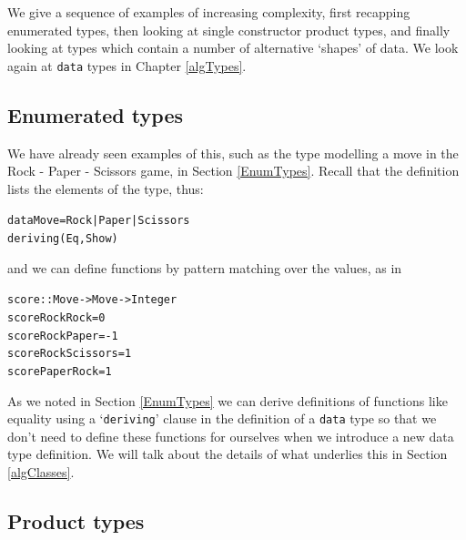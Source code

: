We give a sequence of examples of increasing complexity, first recapping enumerated types, then looking at single constructor product types, and finally looking at types which contain a number of alternative `shapes' of data. We look again at \texttt{data} types in Chapter \ref{algTypes}.

\subsection*{Enumerated types}

We have already seen examples of this, such as the type modelling a move in the Rock - Paper - Scissors game, in Section \ref{EnumTypes}. Recall that the definition lists the elements of the type, thus: 
\begin{alltt}
data Move = Rock | Paper | Scissors 
            deriving (Eq,Show)
\end{alltt}
and we can define functions by pattern matching over the values, as in
\begin{alltt}
score :: Move -> Move -> Integer
score Rock Rock     = 0
score Rock Paper    = -1
score Rock Scissors = 1
score Paper Rock    = 1
\end{alltt}
As we noted in Section \ref{EnumTypes} we can derive definitions of functions like equality using a `\texttt{deriving}' clause in the definition of a \texttt{data} type so that we don't need to define these functions for ourselves when we introduce a new data type definition. We will talk about the details of what underlies this in Section \ref{algClasses}.
 
 
\subsection*{Product types}

